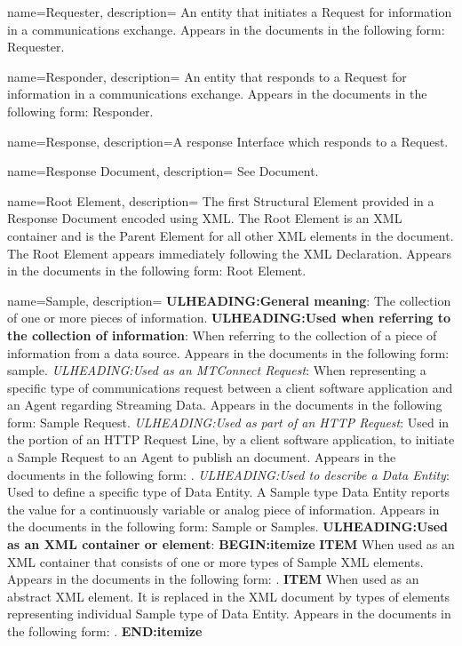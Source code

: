 {
    name={Requester},
	description={
	An entity that initiates a \gls{Request} for information in a communications exchange.
	Appears in the documents in the following form: \gls{Requester}.
}
}

{
    name={Responder},
	description={
	An entity that responds to a \gls{Request} for information in a communications exchange.
	Appears in the documents in the following form: \gls{Responder}.
}
}

{
    name={Response},
	description={A response \gls{Interface} which responds to a \gls{Request}.}
}

{
    name={Response Document},
	description={
	See \gls{Document}.
}
}

{
    name={Root Element},
	description={
	The first \gls{Structural Element} provided in a \gls{Response Document} encoded using XML.  The \gls{Root Element} is an XML container and is the \gls{Parent Element} for all other XML elements in the document.  The \gls{Root Element} appears immediately following the XML Declaration.
	Appears in the documents in the following form: \gls{Root Element}.
}
}

{
    name={Sample},
	description={
	\textbf{ULHEADING:General meaning}:
	The collection of one or more pieces of information.  
	\textbf{ULHEADING:Used when referring to the collection of information}:
	When referring to the collection of a piece of information from a data source.
	Appears in the documents in the following form: sample.
	\textit{ULHEADING:Used as an \gls{MTConnect Request}}:
	When representing a specific type of communications request between a client software application and an \gls{Agent} regarding \gls{Streaming Data}.  
	Appears in the documents in the following form: \gls{Sample Request}.
	\textit{ULHEADING:Used as part of an \gls{HTTP Request}}:
	Used in the  portion of an \gls{HTTP Request Line}, by a client software application, to initiate a \gls{Sample Request} to an \gls{Agent} to publish an  document.
	Appears in the documents in the following form: .
	\textit{ULHEADING:Used to describe a \gls{Data Entity}}:
	Used to define a specific type of \gls{Data Entity}.  A \gls{Sample} type \gls{Data Entity} reports the value for a continuously variable or analog piece of information.
	Appears in the documents in the following form: \gls{Sample} or \gls{Samples}.
	\textbf{ULHEADING:Used as an XML container or element}:
    \textbf{BEGIN:itemize}
	\textbf{ITEM} When used as an XML container that consists of one or more types of Sample XML elements.
	Appears in the documents in the following form: .
	\textbf{ITEM} When used as an abstract XML element.  It is replaced in the XML document by types of  elements representing individual \gls{Sample} type of \gls{Data Entity}.
	Appears in the documents in the following form: .
    \textbf{END:itemize}
}
}

